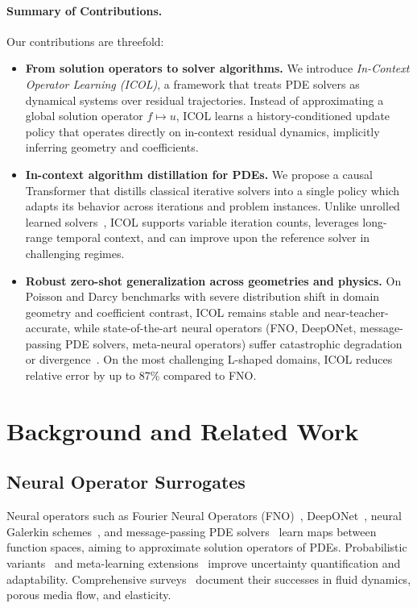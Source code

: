 \documentclass{article}
\begin{document}
\paragraph{Summary of Contributions.}
Our contributions are threefold:
\begin{itemize}
\item \textbf{From solution operators to solver algorithms.}
We introduce \emph{In-Context Operator Learning (ICOL)}, a framework that treats PDE solvers as dynamical systems over residual trajectories. Instead of approximating a global solution operator $f \mapsto u$, ICOL learns a history-conditioned update policy that operates directly on in-context residual dynamics, implicitly inferring geometry and coefficients.
\item \textbf{In-context algorithm distillation for PDEs.}
We propose a causal Transformer that distills classical iterative solvers into a single policy which adapts its behavior across iterations and problem instances. Unlike unrolled learned solvers~\cite{li2020neuralpde,hoyer2023learning}, ICOL supports variable iteration counts, leverages long-range temporal context, and can improve upon the reference solver in challenging regimes.
\item \textbf{Robust zero-shot generalization across geometries and physics.}
On Poisson and Darcy benchmarks with severe distribution shift in domain geometry and coefficient contrast, ICOL remains stable and near-teacher-accurate, while state-of-the-art neural operators (FNO, DeepONet, message-passing PDE solvers, meta-neural operators) suffer catastrophic degradation or divergence~\cite{li2020fourier,lu2021deeponet,brandstetter2022message,finzi2021probabilistic,huang2022metano}. On the most challenging L-shaped domains, ICOL reduces relative error by up to 87\% compared to FNO.
\end{itemize}

\section{Background and Related Work}

\subsection{Neural Operator Surrogates}

Neural operators such as Fourier Neural Operators (FNO)~\cite{li2020fourier}, DeepONet~\cite{lu2021deeponet}, neural Galerkin schemes~\cite{li2022neuralgalerkin}, and message-passing PDE solvers~\cite{brandstetter2022message} learn maps between function spaces, aiming to approximate solution operators of PDEs. Probabilistic variants~\cite{finzi2021probabilistic} and meta-learning extensions~\cite{huang2022metano} improve uncertainty quantification and adaptability. Comprehensive surveys~\cite{kovachki2021neuraloperators,lu2022comprehensive,dong2023operatorreview,li2022neuraloperatorreview} document their successes in fluid dynamics, porous media flow, and elasticity.
\end{document}
